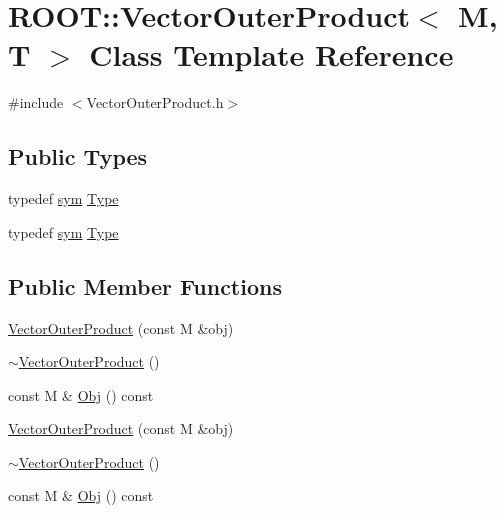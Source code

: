 \hypertarget{classROOT_1_1Minuit2_1_1VectorOuterProduct}{}\section{R\+O\+OT\+:\+:Vector\+Outer\+Product$<$ M, T $>$ Class Template Reference}
\label{classROOT_1_1Minuit2_1_1VectorOuterProduct}


{\ttfamily \#include $<$Vector\+Outer\+Product.\+h$>$}

\subsection*{Public Types}
\begin{DoxyCompactItemize}
\item 
typedef \mbox{\hyperlink{classROOT_1_1Minuit2_1_1sym}{sym}} \mbox{\hyperlink{classROOT_1_1Minuit2_1_1VectorOuterProduct_aea9ef9ec90fc733d5bac6abfbf96b60e}{Type}}
\item 
typedef \mbox{\hyperlink{classROOT_1_1Minuit2_1_1sym}{sym}} \mbox{\hyperlink{classROOT_1_1Minuit2_1_1VectorOuterProduct_aea9ef9ec90fc733d5bac6abfbf96b60e}{Type}}
\end{DoxyCompactItemize}
\subsection*{Public Member Functions}
\begin{DoxyCompactItemize}
\item 
\mbox{\hyperlink{classROOT_1_1Minuit2_1_1VectorOuterProduct_a401cdb635db5f6721ea2dd675c5a979e}{Vector\+Outer\+Product}} (const M \&obj)
\item 
\mbox{\hyperlink{classROOT_1_1Minuit2_1_1VectorOuterProduct_a866532a01279d52fad9ad3a925eb9660}{$\sim$\+Vector\+Outer\+Product}} ()
\item 
const M \& \mbox{\hyperlink{classROOT_1_1Minuit2_1_1VectorOuterProduct_a9326f6e70b3760159b6b74dded8311d3}{Obj}} () const
\item 
\mbox{\hyperlink{classROOT_1_1Minuit2_1_1VectorOuterProduct_a401cdb635db5f6721ea2dd675c5a979e}{Vector\+Outer\+Product}} (const M \&obj)
\item 
\mbox{\hyperlink{classROOT_1_1Minuit2_1_1VectorOuterProduct_a866532a01279d52fad9ad3a925eb9660}{$\sim$\+Vector\+Outer\+Product}} ()
\item 
const M \& \mbox{\hyperlink{classROOT_1_1Minuit2_1_1VectorOuterProduct_a9326f6e70b3760159b6b74dded8311d3}{Obj}} () const
\end{DoxyCompactItemize}


